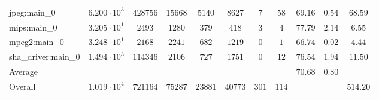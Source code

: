 \begin{tabular}{|l|c|c|c|c|c|c|c|c|c|c|}
jpeg:main\_0            & $ 6.200 \cdot 10^{3} $ & $ 428756 $ & $ 15668 $ & $ 5140  $ & $ 8627  $ & $ 7   $ & $ 58  $ & $ 69.16       $ & $ 0.54    $ & $ 68.59   $ \\
mips:main\_0            & $ 3.205 \cdot 10^{1} $ & $ 2493   $ & $ 1280  $ & $ 379   $ & $ 418   $ & $ 3   $ & $ 4   $ & $ 77.79       $ & $ 2.14    $ & $ 6.55    $ \\
mpeg2:main\_0           & $ 3.248 \cdot 10^{1} $ & $ 2168   $ & $ 2241  $ & $ 682   $ & $ 1219  $ & $ 0   $ & $ 1   $ & $ 66.74       $ & $ 0.02    $ & $ 4.44    $ \\
sha\_driver:main\_0     & $ 1.494 \cdot 10^{3} $ & $ 114346 $ & $ 2106  $ & $ 727   $ & $ 1751  $ & $ 0   $ & $ 12  $ & $ 76.54       $ & $ 1.94    $ & $ 11.50   $ \\
\hline
Average                 & $                    $ & $        $ & $       $ & $       $ & $       $ & $     $ & $     $ & $ 70.68       $ & $ 0.80    $ & $         $ \\
\hline
Overall                 & $ 1.019 \cdot 10^{4} $ & $ 721164 $ & $ 75287 $ & $ 23881 $ & $ 40773 $ & $ 301 $ & $ 114 $ & $             $ & $         $ & $ 514.20  $ \\
\hline
\end{tabular}

